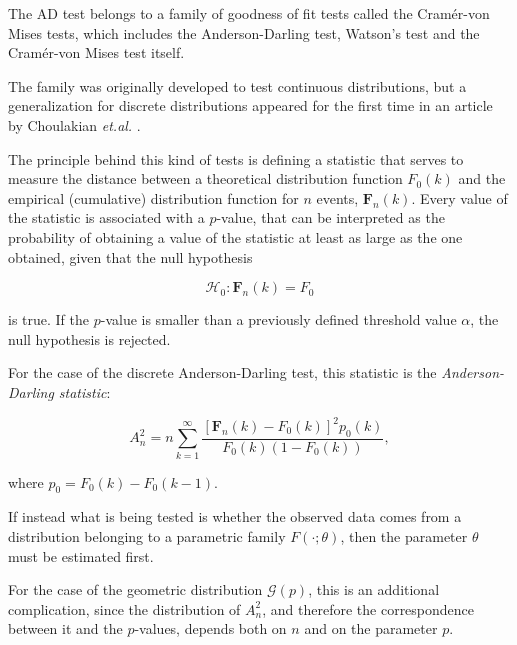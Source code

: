 \documentclass[paper=letter, fontsize=12pt]{scrartcl}
\numberwithin{equation}{section}
\numberwithin{figure}{section}
\begin{document}
The AD test belongs to a family of goodness of fit tests called the Cram\'{e}r-von Mises tests,
 which includes the Anderson-Darling test, Watson's test and the Cram\'{e}r-von Mises test
 itself.
 
The family was originally developed to test continuous distributions, but a generalization 
 for discrete distributions appeared for the first time in an article by Choulakian {\it
 et.al.} \cite{Choulakian}. 

 
 The principle behind this kind of tests is defining a statistic that serves to
 measure the distance between a theoretical distribution function $F_0(k)$ and the empirical
 (cumulative) distribution function for $n$ events, $\mathbf{F}_n(k)$.
 Every value of the statistic is associated with a $p$-value, that can be interpreted as the
 probability of obtaining a value of the statistic at least as large as the one obtained, given
 that the null hypothesis
 
 \begin{equation} 
 \label{eq_null_hypothesis}
 \mathcal{H}_0: \mathbf{F}_n(k) = F_0
 \end{equation}
 
 \noindent
 is true. If the $p$-value is smaller than a previously defined threshold value $\alpha$,
 the null hypothesis is rejected.
 
 For the case of the discrete Anderson-Darling test, this statistic is the
 {\it Anderson-Darling statistic}:

 
 \begin{equation}
 \label{eq_statistic}
 A_n^2 = n\sum_{k=1}^{\infty}\frac{[\mathbf{F}_n(k) - F_0(k)]^2p_0(k)}{F_0(k)(1-F_0(k))},
 \end{equation}
 
 \noindent
 where $p_0=F_0(k) - F_0(k-1)$.
 
 
 If instead what is being tested is whether the observed data comes from a
 distribution belonging to a parametric family $F(\cdot;\theta)$, then the parameter $\theta$
 must be estimated first.

 For the case of the geometric distribution $\mathcal{G}(p)$,
 this is an additional complication,
 since the distribution of $A_n^2$, and therefore the correspondence between it and the
 $p$-values, depends both on $n$ and on the parameter $p$.
 
\end{document}
